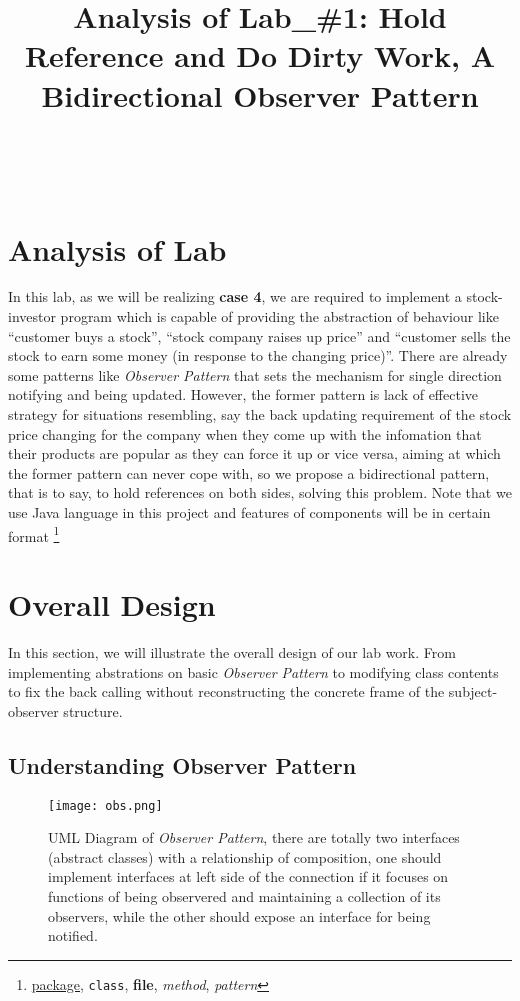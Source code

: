 \documentclass[a4paper]{article}
\title{Analysis of Lab\_\#1: Hold Reference and Do Dirty Work,
    A Bidirectional Observer Pattern}
\makeatletter
\renewcommand{\maketitle}{\bgroup\setlength{\parindent}{0pt}
    \begin{center}

        \textbf{\Large\@title} \\[12pt]


        \par\vspace{\baselineskip}
    \end{center}

\egroup}
\makeatother
\begin{document}
\maketitle

\section{Analysis of Lab}%
\label{sec:analysis_of_lab}

In this lab, as we will be realizing \textbf{case 4},
we are required to implement a stock-investor program
which is capable of providing the abstraction of behaviour like
``customer buys a stock'', ``stock company raises up price'' and
``customer sells the stock to earn some money (in response to
the changing price)''. There are already some patterns like
\textit{Observer Pattern} that sets the mechanism for
single direction notifying and being updated. However,
the former pattern is lack of effective strategy for
situations resembling, say the back updating requirement of
the stock price changing for the company when they come up with the infomation
that their products are popular as they can force it up or vice versa, aiming at
which the former pattern can never cope with, so we propose
a bidirectional pattern, that is to say, to hold references on
both sides, solving this problem. Note that we use Java language in
this project and features of components will be in certain format
\footnote{\underline{package}, \texttt{class}, \textbf{file}, \textsl{method}, \textit{pattern}}

\section{Overall Design}%
\label{sec:overall_design}

In this section, we will illustrate the overall design of our lab work.
From implementing abstrations on basic \textit{Observer Pattern}
to modifying class contents to fix the back calling without reconstructing
the concrete frame of the subject-observer structure.

\subsection{Understanding Observer Pattern}%
\begin{figure}[h]
    \centering
    \texttt{[image: obs.png]}
    \caption{UML Diagram of \textit{Observer Pattern}, there are
    totally two interfaces (abstract classes) with a relationship of
    composition, one should implement interfaces at left side of
    the connection if it focuses on functions of being observered and
    maintaining a collection of its observers, while the other should
    expose an interface for being notified.
}
    \label{fig:obs_pattern}
\end{figure}
\label{sub:understanding_observer_pattern}
\end{document}

